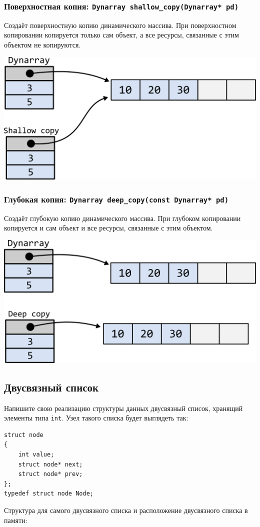 \documentclass[10pt]{article}
\begin{document}
\subsubsection{Поверхностная копия: \texttt{Dynarray shallow\_copy(Dynarray* pd)}}
Создаёт поверхностную копию динамического массива. При поверхностном копировании копируется только сам объект, а все ресурсы, связанные с этим объектом не копируются.
\begin{center}
\includegraphics[scale=0.8]{../images/dynarray_shallow.png}
\end{center}

\subsubsection{Глубокая копия: \texttt{Dynarray deep\_copy(const Dynarray* pd)}}
Создаёт глубокую копию динамического массива. При глубоком копировании копируется и сам объект и все ресурсы, связанные с этим объектом.
\begin{center}
\includegraphics[scale=0.8]{../images/dynarray_deep.png}
\end{center}

\newpage
\subsection{Двусвязный список}
Напишите свою реализацию структуры данных двусвязный список, хранящий элементы типа \texttt{int}.
Узел такого списка будет выглядеть так:
\begin{lstlisting}
struct node 
{
    int value;
    struct node* next;
    struct node* prev;
};
typedef struct node Node;
\end{lstlisting}
Структура для самого двусвязного списка и расположение двусвязного списка в памяти:\\
\end{document}
